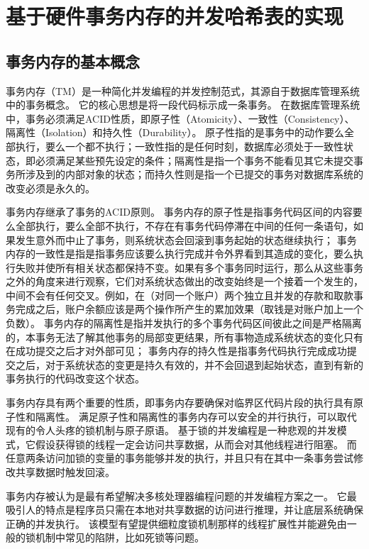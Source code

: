
\chapter{基于硬件事务内存的并发哈希表的实现}

\section{事务内存的基本概念}
事务内存（TM）是一种简化并发编程的并发控制范式，其源自于数据库管理系统中的事务概念。
它的核心思想是将一段代码标示成一条事务。
在数据库管理系统中，事务必须满足ACID性质，即原子性（Atomicity）、一致性（Consistency）、隔离性（Isolation）和持久性（Durability）。
原子性指的是事务中的动作要么全部执行，要么一个都不执行；一致性指的是任何时刻，数据库必须处于一致性状态，即必须满足某些预先设定的条件；隔离性是指一个事务不能看见其它未提交事务所涉及到的内部对象的状态；而持久性则是指一个已提交的事务对数据库系统的改变必须是永久的。

事务内存继承了事务的ACID原则。
事务内存的原子性是指事务代码区间的内容要么全部执行，要么全部不执行，不存在有事务代码停滞在中间的任何一条语句，如果发生意外而中止了事务，则系统状态会回滚到事务起始的状态继续执行；
事务内存的一致性是指是指事务应该要么执行完成并令外界看到其造成的变化，要么执行失败并使所有相关状态都保持不变。如果有多个事务同时运行，那么从这些事务之外的角度来进行观察，它们对系统状态做出的改变始终是一个接着一个发生的，中间不会有任何交叉。例如，在（对同一个账户）两个独立且并发的存款和取款事务完成之后，账户余额应该是两个操作所产生的累加效果（取钱是对账户加上一个负数）。
事务内存的隔离性是指并发执行的多个事务代码区间彼此之间是严格隔离的，本事务无法了解其他事务的局部变更结果，所有事物造成系统状态的变化只有在成功提交之后才对外部可见；
事务内存的持久性是指事务代码执行完成成功提交之后，对于系统状态的变更是持久有效的，并不会回退到起始状态，直到有新的事务执行的代码改变这个状态。

事务内存具有两个重要的性质，即事务内存要确保对临界区代码片段的执行具有原子性和隔离性。
满足原子性和隔离性的事务内存可以安全的并行执行，可以取代现有的令人头疼的锁机制与原子原语。
基于锁的并发编程是一种悲观的并发模式，它假设获得锁的线程一定会访问共享数据，从而会对其他线程进行阻塞。
而任意两条访问加锁的变量的事务能够并发的执行，并且只有在其中一条事务尝试修改共享数据时触发回滚。

事务内存被认为是最有希望解决多核处理器编程问题的并发编程方案之一。
它最吸引人的特点是程序员只需在本地对共享数据的访问进行推理，并让底层系统确保正确的并发执行。
该模型有望提供细粒度锁机制那样的线程扩展性并能避免由一般的锁机制中常见的陷阱，比如死锁等问题。

